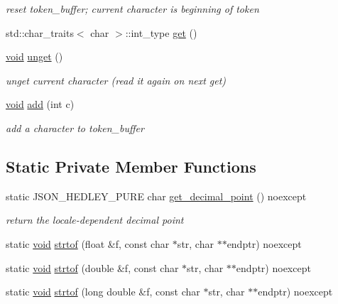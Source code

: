 \begin{DoxyCompactItemize}
\begin{DoxyCompactList}\small\item\em reset token\+\_\+buffer; current character is beginning of token \end{DoxyCompactList}\item 
std\+::char\+\_\+traits$<$ char $>$\+::int\+\_\+type \hyperlink{classnlohmann_1_1detail_1_1lexer_a901e45a34e1fb1d97ab62350b0c3ef26}{get} ()
\item 
\hyperlink{namespacenlohmann_1_1detail_a59fca69799f6b9e366710cb9043aa77d}{void} \hyperlink{classnlohmann_1_1detail_1_1lexer_a626f145768762057dc68a4666eb577db}{unget} ()
\begin{DoxyCompactList}\small\item\em unget current character (read it again on next get) \end{DoxyCompactList}\item 
\hyperlink{namespacenlohmann_1_1detail_a59fca69799f6b9e366710cb9043aa77d}{void} \hyperlink{classnlohmann_1_1detail_1_1lexer_acec899d31af1fd647911e46e8535c283}{add} (int c)
\begin{DoxyCompactList}\small\item\em add a character to token\+\_\+buffer \end{DoxyCompactList}\end{DoxyCompactItemize}
\subsection*{Static Private Member Functions}
\begin{DoxyCompactItemize}
\item 
static J\+S\+O\+N\+\_\+\+H\+E\+D\+L\+E\+Y\+\_\+\+P\+U\+RE char \hyperlink{classnlohmann_1_1detail_1_1lexer_ae90334f30e7c12d5394c116bcfecac19}{get\+\_\+decimal\+\_\+point} () noexcept
\begin{DoxyCompactList}\small\item\em return the locale-\/dependent decimal point \end{DoxyCompactList}\item 
static \hyperlink{namespacenlohmann_1_1detail_a59fca69799f6b9e366710cb9043aa77d}{void} \hyperlink{classnlohmann_1_1detail_1_1lexer_a1a2d4cc5d9fed4783aa2a98497925511}{strtof} (float \&f, const char $\ast$str, char $\ast$$\ast$endptr) noexcept
\item 
static \hyperlink{namespacenlohmann_1_1detail_a59fca69799f6b9e366710cb9043aa77d}{void} \hyperlink{classnlohmann_1_1detail_1_1lexer_a8cd877d10b31bc819e4f030292737ea6}{strtof} (double \&f, const char $\ast$str, char $\ast$$\ast$endptr) noexcept
\item 
static \hyperlink{namespacenlohmann_1_1detail_a59fca69799f6b9e366710cb9043aa77d}{void} \hyperlink{classnlohmann_1_1detail_1_1lexer_a0e28dda9a1e007d55d03e8d39dd3b9fa}{strtof} (long double \&f, const char $\ast$str, char $\ast$$\ast$endptr) noexcept
\end{DoxyCompactItemize}
